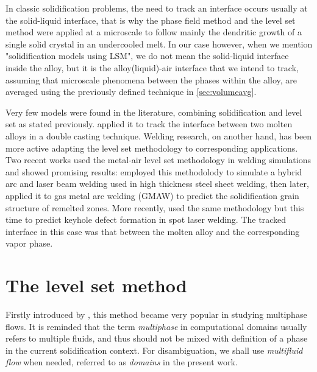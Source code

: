 In classic solidification problems, the need to track an interface occurs usually at the solid-liquid interface, that is why the phase field
method \citep{karma_phase-field_1996,boettinger_phase-field_2002} and the level set method \citep{chen_simple_1997,gibou_level_2003,tan_level_2007} 
were applied at a microscale to follow mainly the dendritic growth of a single solid crystal in an undercooled melt.
In our case however, when we mention "solidification models using LSM", we 
do not mean the solid-liquid interface inside the alloy, but it is the alloy(liquid)-air interface that we intend to track, assuming that microscale
phenomena between the phases within the alloy, are averaged using the previously defined technique in \cref{sec:volumeavg}.

Very few models were found in the literature, combining solidification and level set as stated previously. 
\citet{du_simulating_2001} applied it to track the interface between two molten alloys in a double casting technique. 
Welding research, on another hand, has been more active adapting the level set methodology to corresponding applications. 
Two recent works used the metal-air level set methodology in welding simulations and showed promising results: 
\citet{desmaison_level_2014} employed this methodolody to simulate a hybrid arc and laser beam welding 
used in high thickness steel sheet welding, then later, \citet{chen_three_2014} applied it to gas metal arc welding (GMAW) to predict 
the solidification grain structure of remelted zones.
More recently, \citet{courtois_complete_2014} used the same methodology but this time to predict keyhole defect formation
in spot laser welding. The tracked interface in this case was that between the molten alloy and the corresponding vapor phase.
%
%
\section{The level set method}
Firstly introduced by \citet{osher_fronts_1988}, this method became very popular in studying multiphase flows.
It is reminded that the term \emph{multiphase} in computational domains usually refers to multiple fluids, and thus
should not be mixed with definition of a phase in the current solidification context. For disambiguation, we shall
use \emph{multifluid flow} when needed, referred to as \emph{domains} in the present work.

